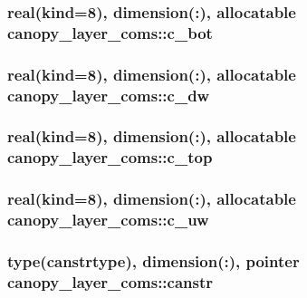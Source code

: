 \subsubsection[{c\+\_\+bot}]{\setlength{\rightskip}{0pt plus 5cm}real(kind=8), dimension(\+:), allocatable canopy\+\_\+layer\+\_\+coms\+::c\+\_\+bot}\label{namespacecanopy__layer__coms_aa62cf8de84772d0d7f4985ccd01ad4c1}
\hypertarget{namespacecanopy__layer__coms_ad0bcaad69c487152e827bca2f683297b}{}
\subsubsection[{c\+\_\+dw}]{\setlength{\rightskip}{0pt plus 5cm}real(kind=8), dimension(\+:), allocatable canopy\+\_\+layer\+\_\+coms\+::c\+\_\+dw}\label{namespacecanopy__layer__coms_ad0bcaad69c487152e827bca2f683297b}
\hypertarget{namespacecanopy__layer__coms_a83e6e25d502c4ff6f389c2d353645e5d}{}
\subsubsection[{c\+\_\+top}]{\setlength{\rightskip}{0pt plus 5cm}real(kind=8), dimension(\+:), allocatable canopy\+\_\+layer\+\_\+coms\+::c\+\_\+top}\label{namespacecanopy__layer__coms_a83e6e25d502c4ff6f389c2d353645e5d}
\hypertarget{namespacecanopy__layer__coms_adb9b19c4fae670208f123d80f3913252}{}
\subsubsection[{c\+\_\+uw}]{\setlength{\rightskip}{0pt plus 5cm}real(kind=8), dimension(\+:), allocatable canopy\+\_\+layer\+\_\+coms\+::c\+\_\+uw}\label{namespacecanopy__layer__coms_adb9b19c4fae670208f123d80f3913252}
\hypertarget{namespacecanopy__layer__coms_a502cb30a5dce6c1049f734d995cf96b7}{}
\subsubsection[{canstr}]{\setlength{\rightskip}{0pt plus 5cm}type({\bf canstrtype}), dimension(\+:), pointer canopy\+\_\+layer\+\_\+coms\+::canstr}\label{namespacecanopy__layer__coms_a502cb30a5dce6c1049f734d995cf96b7}
\hypertarget{namespacecanopy__layer__coms_a0a4553817f56ab7ff99a7dc9e6cec22b}{}
